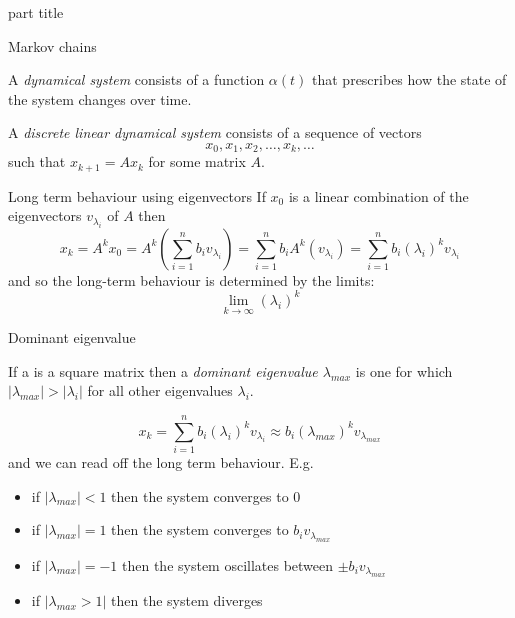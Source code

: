 \documentclass{beamer}
\begin{document}
\begin{frame}
\begin{beamercolorbox}[sep=12pt,center]{part title}
\insertsection\par
\end{beamercolorbox}
\end{frame}

\begin{frame}{Markov chains}
\begin{definition}
	A \emph{dynamical system} consists of a function $\alpha(t)$ that prescribes how the state of the system changes over time. 
\end{definition}
\begin{definition}
	A \emph{discrete linear dynamical system} consists of a sequence of vectors
	\begin{equation*}
	x_0, x_1, x_2, \dots, x_k, \dots
	\end{equation*}
	such that $x_{k+1} = Ax_{k}$ for some matrix $A$.
\end{definition}
\end{frame}

\begin{frame}{Long term behaviour using eigenvectors}
If $x_0$ is a linear combination of the eigenvectors $v_{\lambda_i}$ of $A$ then 
\begin{equation*}
x_k = A^k x_0 = A^k\left(\sum_{i=1}^n b_i v_{\lambda_i}\right) = \sum_{i=1}^n b_i A^k\left(v_{\lambda_i}\right) = \sum_{i=1}^nb_i(\lambda_i)^kv_{\lambda_i}
\end{equation*}
and so the long-term behaviour is determined by the limits:
\begin{equation*}
\lim_{k\to \infty} (\lambda_i)^k
\end{equation*}
\end{frame}

\begin{frame}{Dominant eigenvalue}
\begin{definition}
	If a is a square matrix then a \emph{dominant eigenvalue $\lambda_{max}$} is one for which $|\lambda_{max}|>|\lambda_i|$ for all other eigenvalues $\lambda_i$.
\end{definition}
\begin{equation*}
x_k = \sum_{i=1}^n b_i (\lambda_i)^k v_{\lambda_i} \approx b_i (\lambda_{max})^k v_{\lambda_{max}}
\end{equation*}
and we can read off the long term behaviour. E.g.
\begin{itemize}
	\item if $|\lambda_{max}|< 1$ then the system converges to $0$
	\item if $|\lambda_{max}| = 1$ then the system converges to $b_iv_{\lambda_{max}}$
	\item if $|\lambda_{max}| = -1$ then the system oscillates between $\pm b_iv_{\lambda_{max}}$
	\item if $|\lambda_{max}>1|$ then the system diverges
\end{itemize}
\end{frame}
\end{document}
